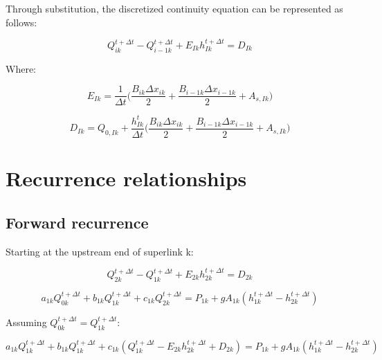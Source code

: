\documentclass[11pt]{article}
\begin{document}
Through substitution, the discretized continuity equation can be represented as follows: 

\begin{equation}
  \boxed{
 Q_{ik}^{t + \Delta t} - Q_{i - 1k}^{t + \Delta t} + E_{Ik} h_{Ik}^{t + \Delta t} = D_{Ik}
 }
\end{equation}

Where:

\begin{equation}
  \boxed{
 E_{Ik} = \frac{1}{\Delta t} \biggl( \frac{B_{ik} \Delta x_{ik}}{2} + \frac{B_{i - 1k} \Delta x_{i - 1k}}{2} + A_{s,Ik}  \biggr) 
 }
\end{equation}

\begin{equation}
  \boxed{
 D_{Ik} = Q_{0,Ik} + \frac{h_{Ik}^t}{\Delta t} \biggl( \frac{B_{ik} \Delta x_{ik}}{2} + \frac{B_{i - 1k} \Delta x_{i - 1k}}{2} + A_{s,Ik}  \biggr) 
 }
\end{equation}

\section{Recurrence relationships}

\subsection{Forward recurrence}

Starting at the upstream end of superlink k:

\begin{equation}
  Q_{2k}^{t + \Delta t} - Q_{1k}^{t + \Delta t} + E_{2k} h_{2k}^{t + \Delta t} = D_{2k}
\end{equation}


\begin{equation}
   a_{1k} Q_{0k}^{t + \Delta t} + b_{1k} Q_{1k}^{t + \Delta t} + c_{1k} Q_{2k}^{t + \Delta t} = P_{1k} + g A_{1k} (h_{1k}^{t + \Delta t} - h_{2k}^{t + \Delta t})
\end{equation}

Assuming $Q_{0k}^{t + \Delta t} = Q_{1k}^{t + \Delta t}$:

\begin{equation}
  a_{1k} Q_{1k}^{t + \Delta t} + b_{1k} Q_{1k}^{t + \Delta t} + c_{1k} (Q_{1k}^{t + \Delta t} - E_{2k} h_{2k}^{t + \Delta t} + D_{2k}) = P_{1k} + g A_{1k} (h_{1k}^{t + \Delta t} - h_{2k}^{t + \Delta t})
\end{equation}
\end{document}
